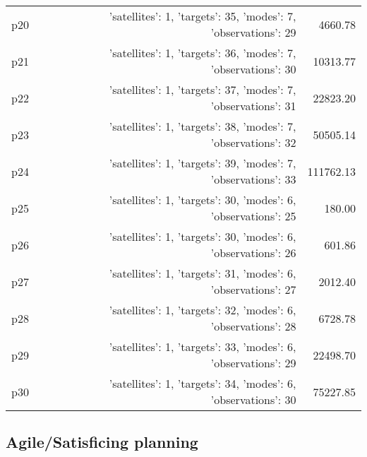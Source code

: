 \documentclass{article}
\begin{document}
\begin{center}
\begin{tabular}{@{}l|r|r@{}}
  p20&{'satellites': 1, 'targets': 35, 'modes': 7, 'observations': 29}&4660.78\\
  p21&{'satellites': 1, 'targets': 36, 'modes': 7, 'observations': 30}&10313.77\\
  p22&{'satellites': 1, 'targets': 37, 'modes': 7, 'observations': 31}&22823.20\\
  p23&{'satellites': 1, 'targets': 38, 'modes': 7, 'observations': 32}&50505.14\\
  p24&{'satellites': 1, 'targets': 39, 'modes': 7, 'observations': 33}&111762.13\\
  p25&{'satellites': 1, 'targets': 30, 'modes': 6, 'observations': 25}&180.00\\
  p26&{'satellites': 1, 'targets': 30, 'modes': 6, 'observations': 26}&601.86\\
  p27&{'satellites': 1, 'targets': 31, 'modes': 6, 'observations': 27}&2012.40\\
  p28&{'satellites': 1, 'targets': 32, 'modes': 6, 'observations': 28}&6728.78\\
  p29&{'satellites': 1, 'targets': 33, 'modes': 6, 'observations': 29}&22498.70\\
  p30&{'satellites': 1, 'targets': 34, 'modes': 6, 'observations': 30}&75227.85
                            \end{tabular}
                            \end{center}
                    

                                \subsection*{Agile/Satisficing planning}
                                
\end{document}
